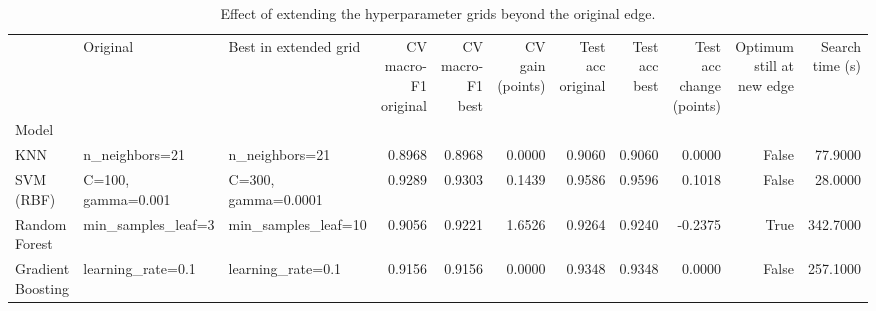 \begin{table}
\caption{Effect of extending the hyperparameter grids beyond the original edge.}
\label{tab:Ext15_extended_grid_sensitivity}
\begin{tabular}{lllrrrrrrrr}
\toprule
 & Original & Best in extended grid & CV macro-F1 original & CV macro-F1 best & CV gain (points) & Test acc original & Test acc best & Test acc change (points) & Optimum still at new edge & Search time (s) \\
Model &  &  &  &  &  &  &  &  &  &  \\
\midrule
KNN & n_neighbors=21 & n_neighbors=21 & 0.8968 & 0.8968 & 0.0000 & 0.9060 & 0.9060 & 0.0000 & False & 77.9000 \\
SVM (RBF) & C=100, gamma=0.001 & C=300, gamma=0.0001 & 0.9289 & 0.9303 & 0.1439 & 0.9586 & 0.9596 & 0.1018 & False & 28.0000 \\
Random Forest & min_samples_leaf=3 & min_samples_leaf=10 & 0.9056 & 0.9221 & 1.6526 & 0.9264 & 0.9240 & -0.2375 & True & 342.7000 \\
Gradient Boosting & learning_rate=0.1 & learning_rate=0.1 & 0.9156 & 0.9156 & 0.0000 & 0.9348 & 0.9348 & 0.0000 & False & 257.1000 \\
\bottomrule
\end{tabular}
\end{table}
